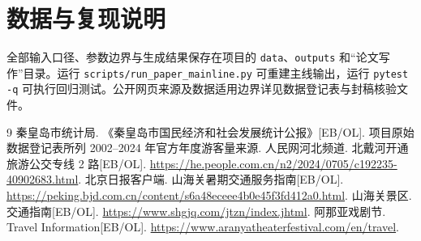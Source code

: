 \documentclass[UTF8,12pt,a4paper]{ctexart}
\begin{document}
\section*{数据与复现说明}
全部输入口径、参数边界与生成结果保存在项目的 \texttt{data}、\texttt{outputs} 和“论文写作”目录。运行 \texttt{scripts/run\_paper\_mainline.py} 可重建主线输出，运行 \texttt{pytest -q} 可执行回归测试。公开网页来源及数据适用边界详见数据登记表与封稿核验文件。

\begin{thebibliography}{9}
 秦皇岛市统计局. 《秦皇岛市国民经济和社会发展统计公报》[EB/OL]. 项目原始数据登记表所列 2002--2024 年官方年度游客量来源.
 人民网河北频道. 北戴河开通旅游公交专线 2 路[EB/OL]. \url{https://he.people.com.cn/n2/2024/0705/c192235-40902683.html}.
 北京日报客户端. 山海关暑期交通服务指南[EB/OL]. \url{https://peking.bjd.com.cn/content/s6a48eceee4b0e45f3fd412a0.html}.
 山海关景区. 交通指南[EB/OL]. \url{https://www.shgjq.com/jtzn/index.jhtml}.
 阿那亚戏剧节. Travel Information[EB/OL]. \url{https://www.aranyatheaterfestival.com/en/travel}.
\end{thebibliography}
\end{document}
